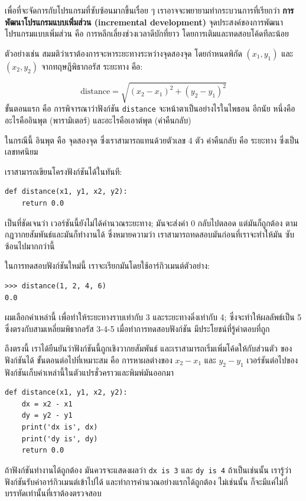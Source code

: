 เพื่อที่จะจัดการกับโปรแกรมที่ซับซ้อนมากขึ้นเรื่อย ๆ เราอาจจะพยายามทำกระบวนการที่เรียกว่า
{\bf การพัฒนาโปรแกรมแบบเพิ่มส่วน (incremental development)} จุดประสงค์ของการพัฒนาโปรแกรมแบบเพิ่มส่วน คือ การหลีกเลี่ยงช่วงเวลาดีบักที่ยาว 
โดยการเติมและทดสอบโค้ดทีละน้อย 

ตัวอย่างเช่น สมมติว่าเราต้องการจะหาระยะทางระหว่างจุดสองจุด โดยกำหนดพิกัด {\scriptsize$(x_1, y_1)$} และ {\scriptsize$(x_2, y_2)$}
จากทฤษฎีพิธากอรัส ระยะทาง คือ:

\begin{displaymath}
\mathrm{distance} = \sqrt{(x_2 - x_1)^2 + (y_2 - y_1)^2}
\end{displaymath}
%
ขั้นตอนแรก คือ การพิจารณาว่าฟังก์ชัน {\tt distance} จะหน้าตาเป็นอย่างไรในไพธอน อีกนัย
หนึ่งคือ อะไรคืออินพุต (พารามิเตอร์) และอะไรคือเอาต์พุต (ค่าคืนกลับ)

ในกรณีนี้ อินพุต คือ จุดสองจุด ซึ่งเราสามารถแทนด้วยตัวเลข 4 ตัว ค่าคืนกลับ คือ
ระยะทาง ซึ่งเป็นเลขทศนิยม

เราสามารถเขียนโครงฟังก์ชันได้ในทันที:

\begin{verbatim}
def distance(x1, y1, x2, y2):
    return 0.0
\end{verbatim}
%
เป็นที่ชัดเจนว่า เวอร์ชันนี้ยังไม่ได้คำนวณระยะทาง; มันจะส่งค่า 0 กลับไปตลอด แต่มันก็ถูกต้อง
ตามกฎวากยสัมพันธ์และมันก็ทำงานได้ ซึ่งหมายความว่า เราสามารถทดสอบมันก่อนที่เราจะทำให้มัน
ซับซ้อนไปมากกว่านี้

ในการทดสอบฟังก์ชันใหม่นี้ เราจะเรียกมันโดยใช้อาร์กิวเมนต์ตัวอย่าง:

\begin{verbatim}
>>> distance(1, 2, 4, 6)
0.0
\end{verbatim}
%
ผมเลือกค่าเหล่านี้ เพื่อทำให้ระยะทางราบเท่ากับ 3 และระยะทางดิ่งเท่ากับ 4; 
ซึ่งจะทำให้ผลลัพธ์เป็น 5 ซึ่งตรงกับสามเหลี่ยมพิธากอรัส 3-4-5 เมื่อทำการทดสอบฟังก์ชัน 
มีประโยชน์ที่รู้คำตอบที่ถูก

ถึงตรงนี้ เราได้ยืนยันว่าฟังก์ชันนี้ถูกเชิงวากยสัมพันธ์ และเราสามารถเริ่มเพิ่มโค้ดให้กับส่วนตัว
ของฟังก์ชันได้ ขั้นตอนต่อไปที่เหมาะสม คือ การหาผลต่างของ {\scriptsize$x_2 - x_1$} และ {\scriptsize$y_2 - y_1$}
เวอร์ชันต่อไปของฟังก์ชันเก็บค่าเหล่านี้ในตัวแปรชั่วคราวและพิมพ์มันออกมา

\begin{verbatim}
def distance(x1, y1, x2, y2):
    dx = x2 - x1
    dy = y2 - y1
    print('dx is', dx)
    print('dy is', dy)
    return 0.0
\end{verbatim}
%
ถ้าฟังก์ชันทำงานได้ถูกต้อง มันควรจะแสดงผลว่า \verb"dx is 3" และ \verb"dy is 4" 
ถ้าเป็นเช่นนั้น เรารู้ว่าฟังก์ชันรับค่าอาร์กิวเมนต์เข้าไปได้ และทำการคำนวณอย่างแรกได้ถูกต้อง 
ไม่เช่นนั้น ก็จะมีแค่ไม่กี่บรรทัดเท่านั้นที่เราต้องตรวจสอบ

